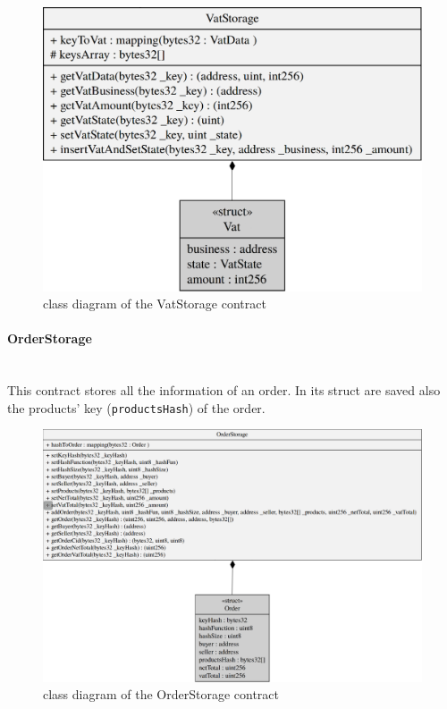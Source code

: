 \begin{figure}[H]
	\centering
	\includegraphics[scale=0.30]{res/images/solidity/vatstorage.png}
	\caption{class diagram of the VatStorage contract}
\end{figure}
\pagebreak

\paragraph{OrderStorage}\mbox{}\\

\noindent This contract stores all the information of an order. In its struct are saved also the products' key (\texttt{productsHash}) of the order.
\begin{figure}[H]
	\centering
	\includegraphics[scale=0.35]{res/images/solidity/orderstorage.png}
	\caption{class diagram of the OrderStorage contract}
\end{figure}
